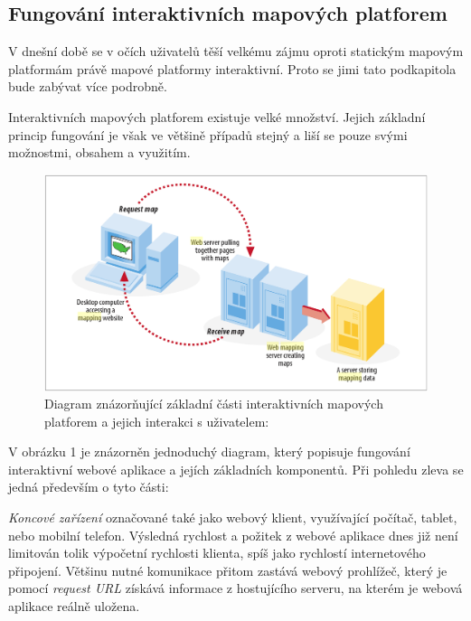 \newpage
\subsection{Fungování interaktivních mapových platforem}
\label{sssec:fungovani-platforem}

V dnešní době se v očích uživatelů těší velkému zájmu oproti statickým mapovým platformám právě mapové platformy interaktivní. Proto se jimi tato podkapitola bude
zabývat více podrobně.

Interaktivních mapových platforem existuje velké množství. Jejich
základní princip fungování je však ve většině případů stejný a liší se
pouze svými možnostmi, obsahem a využitím.

\begin{figure}[h!]
	\centering
	\includegraphics[width=1\textwidth]{../img/map-web-diagram.png}
	\caption{Diagram znázorňující základní části interaktivních mapových platforem a jejich interakci s uživatelem: \cite{web_mapping}}
	\label{fig:WPS_class_diagram}
\end{figure}

V obrázku 1 je znázorněn jednoduchý diagram, který popisuje fungování
interaktivní webové aplikace a jejích základních komponentů. Při
pohledu zleva se jedná především o tyto části:

\textit{Koncové zařízení} označované také jako webový klient,
využívající počítač, tablet, nebo mobilní telefon. Výsledná rychlost a
požitek z webové aplikace dnes již není limitován tolik výpočetní
rychlosti klienta, spíš jako rychlostí internetového
připojení. Většinu nutné komunikace přitom zastává webový prohlížeč,
který je pomocí \textit{request URL} získává informace z hostujícího
serveru, na kterém je webová aplikace reálně uložena.


